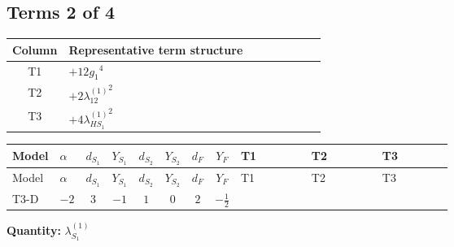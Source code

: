 \documentclass[8pt]{article}
\begin{document}
\begin{landscape}
\subsection*{Terms 2 of 4}
\begin{center}
\begin{tabular}{@{}c >{\raggedright\arraybackslash}p{0.82\linewidth}@{}}
\toprule
Column & Representative term structure \\
\midrule
T1 & \(\displaystyle +12 {g_1}^4\) \\
\midrule
T2 & \(\displaystyle +2 {\lambda_{12}^{(1)}}^2\) \\
\midrule
T3 & \(\displaystyle +4 {\lambda_{HS_1}^{(1)}}^2\) \\
\midrule
\bottomrule
\end{tabular}
\end{center}
\smallskip
\tiny
\begin{longtable}{@{}llcccccc >{\raggedright\arraybackslash}p{0.21\linewidth} >{\raggedright\arraybackslash}p{0.21\linewidth} >{\raggedright\arraybackslash}p{0.21\linewidth}@{}}
\toprule
Model & $\alpha$ & $d_{S_1}$ & $Y_{S_1}$ & $d_{S_2}$ & $Y_{S_2}$ & $d_F$ & $Y_F$ & T1 & T2 & T3 \\
\midrule
\endfirsthead
\toprule
Model & $\alpha$ & $d_{S_1}$ & $Y_{S_1}$ & $d_{S_2}$ & $Y_{S_2}$ & $d_F$ & $Y_F$ & T1 & T2 & T3 \\
\midrule
\endhead
T3-D & $-2$ & $3$ & $-1$ & $1$ & $0$ & $2$ & $-\frac{1}{2}$ & \scriptsize\adjustbox{max width=\linewidth}{$\begin{gathered} +12 {g_1}^4\end{gathered}$} & \scriptsize\adjustbox{max width=\linewidth}{$\begin{gathered} +2 {\lambda_{12}^{(1)}}^2\end{gathered}$} & \scriptsize\adjustbox{max width=\linewidth}{$\begin{gathered} +4 {\lambda_{HS_1}^{(1)}}^2\end{gathered}$} \\
\midrule
\bottomrule
\end{longtable}
\clearpage
\noindent\textbf{Quantity: }$\lambda_{S_1}^{(1)}$\par\smallskip

\end{landscape}
\end{document}
